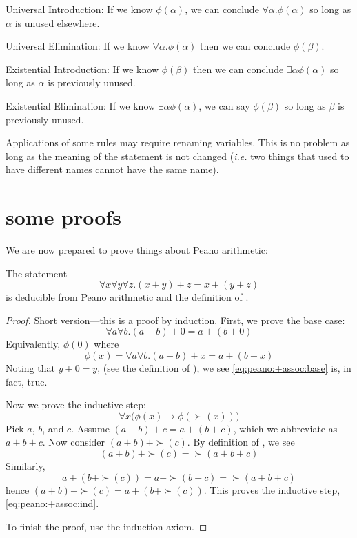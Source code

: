 \documentclass{scrbook}
\renewcommand{\implies}{\to}
\newcommand{\ie}{\emph{i.e.}\xspace}
\begin{document}
 
\begin{trivlist}
\item Universal Introduction:
  If we know $\phi(\alpha)$, we can conclude $\forall \alpha . \phi(\alpha)$ so long as $\alpha$ is unused elsewhere.
\item Universal Elimination:
  If we know $\forall \alpha . \phi(\alpha)$ then we can conclude $\phi(\beta)$. 
\item Existential Introduction:
  If we know $\phi(\beta)$ then we can conclude $\exists \alpha \phi(\alpha)$ so long as $\alpha$ is previously unused.
\item Existential Elimination:
  If we know $\exists \alpha \phi(\alpha)$, we can say $\phi(\beta)$ so long as $\beta$ is previously unused. 
\end{trivlist}
Applications of some rules may require renaming variables. This is no problem as long as the meaning of the statement is not changed (\ie two things that used to have different names cannot have the same name). 

\section[Some Proofs]{some proofs}
We are now prepared to prove things about Peano arithmetic:

\begin{theorem}[$+$ is associative]
  The statement 
  \[
  \forall x \forall y \forall z . (x+y)+z = x+(y+z)
  \]
  is deducible from Peano arithmetic and the definition of .
\end{theorem}
\begin{proof}
  Short version---this is a proof by induction. First, we prove the base case:
   \begin{equation}
    \label{eq:peano:+assoc:base}
    \forall a \forall b .  (a+b) + 0 = a+(b+0)
  \end{equation}
  Equivalently, $\phi(0)$ where
  \[
  \phi(x) = \forall a \forall b . (a+b)+x = a+(b+x)
  \]
  Noting that $y+0=y$, (see the definition of  ), we 
  see \cref{eq:peano:+assoc:base} is, in fact, true. 
 
  Now we prove the inductive step: 
  \begin{equation}
    \label{eq:peano:+assoc:ind}
    \forall x \bigl(\phi(x)\implies \phi(\succ(x))\bigr)   
  \end{equation}
  Pick $a$, $b$, and $c$. 
  Assume $(a+b)+c = a+(b+c)$, which we abbreviate as $a+b+c$. Now consider $(a+b)+\succ(c)$. By definition of , we see \[(a+b)+\succ(c)=\succ(a+b+c)\] Similarly, \[a+(b+\succ(c))=a+\succ(b+c)=\succ(a+b+c)\]
  hence $(a+b)+\succ(c)=a+(b+\succ(c))$. This proves the inductive step, \cref{eq:peano:+assoc:ind}.
  
  To finish the proof, use the induction axiom. 
\end{proof}
\end{document}

